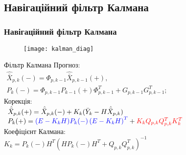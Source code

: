 \documentclass[ucs,compress]{beamer}    %
\begin{document}
\subsection{Навігаційний фільтр Калмана} 
\begin{frame}%
\frametitle{Навігаційний фільтр Калмана}
\begin{figure}[l]
\texttt{[image: kalman\_diag]}
\end{figure}
\begin{block}{Фільтр Калмана}
\small
Прогноз: \\
$\begin{array}{l} 
{\hat{\bar{X}}_{p,k}(-) =\Phi_{p,k-1} \hat{\bar{X}}_{p,k-1}(+) ,} \\ 
{P_{k}(-) =\Phi_{p,k-1} P_{k-1}(+) \Phi ^{T}_{p,k-1} +G_{p,k-1} G_{p,k-1}^{T} ;} \end{array} $ \\
Корекція:\\
$\begin{array}{l} 
{\hat{\bar{X}}_{p,k}(+)=\hat{\bar{X}}_{p,k}(-) + K_{k} (\bar{Y}_{k} -H\hat{\bar{X}}_{p,k} )} \\ 
{P_{k}(+)={\color{blue}(E-K_{k} H)P_{k}(-) \left(E-K_{k} H\right)^{T}} +{\color{red} K_{k} Q_{p,k} Q_{p,k} ^{T} K_{k}^{T}} } 
\end{array} $ \\
Коефіцієнт Калмана:\\
$K_{k} =P_{k}(-) H^{T} (HP_{k}(-) H^{T} +Q_{p,k} Q_{p,k} ^{T} )^{-1} $
\end{block}
\end{frame}
\end{document}
